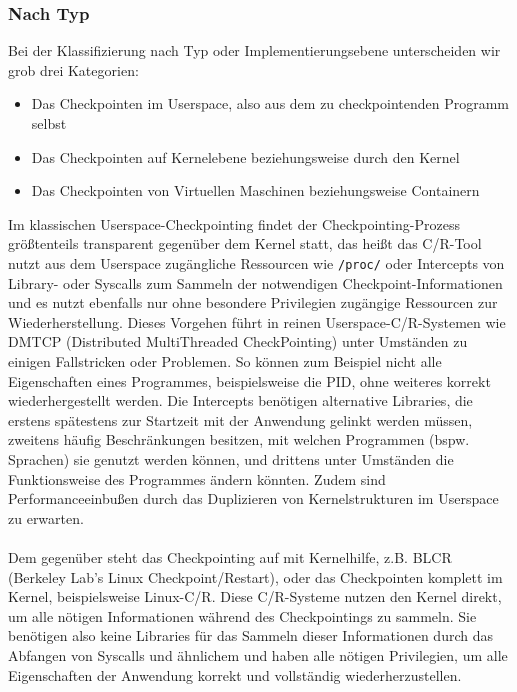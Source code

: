 \documentclass[a4paper]{article}
\begin{document}
\subsubsection{Nach Typ}
Bei der Klassifizierung nach Typ oder Implementierungsebene unterscheiden wir grob drei Kategorien: 
\begin{itemize}
    \item Das Checkpointen im Userspace, also aus dem zu checkpointenden Programm selbst
    \item Das Checkpointen auf Kernelebene beziehungsweise durch den Kernel
    \item Das Checkpointen von Virtuellen Maschinen beziehungsweise Containern
\end{itemize}
Im klassischen Userspace-Checkpointing findet der Checkpointing-Prozess größten\-teils transparent gegenüber dem Kernel statt, das heißt das C/R-Tool nutzt aus dem Userspace zugängliche Ressourcen wie \texttt{/proc/} oder Intercepts von Library- oder Syscalls zum Sammeln der notwendigen Checkpoint-Informationen und es nutzt ebenfalls nur ohne besondere Privilegien zugängige Ressourcen zur Wiederherstellung. 
Dieses Vorgehen führt in reinen Userspace-C/R-Systemen wie DMTCP\cite{dmtcp} (Distributed MultiThreaded CheckPointing) unter Umständen zu einigen Fallstricken oder Problemen. 
So können zum Beispiel nicht alle Eigenschaften eines Programmes, beispielsweise die PID, ohne weiteres korrekt wiederhergestellt werden. 
Die Intercepts benötigen alternative Libraries, die erstens spätestens zur Startzeit mit der Anwendung gelinkt werden müssen, zweitens häufig Beschränkungen besitzen, mit welchen Programmen (bspw. Sprachen) sie genutzt werden können, und drittens unter Umständen die Funktionsweise des Programmes ändern könnten. Zudem sind Performanceeinbußen durch das Duplizieren von Kernelstrukturen im Userspace zu erwarten.\\ \\
Dem gegenüber steht das Checkpointing auf mit Kernelhilfe, z.B. BLCR\cite{BLCR} (Berkeley Lab's Linux Checkpoint/Restart), oder das Checkpointen komplett im Kernel, beispielsweise Linux-C/R\cite{linuxcr}.
Diese C/R-Systeme nutzen den Kernel direkt, um alle nötigen Informationen während des Checkpointings zu sammeln. 
Sie benötigen also keine Libraries für das Sammeln dieser Informationen durch das Abfangen von Syscalls und ähnlichem und haben alle nötigen Privilegien, um alle Eigenschaften der Anwendung korrekt und vollständig wiederherzustellen. 
\end{document}
